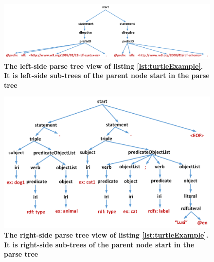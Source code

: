 \begin{figure}
		\centering\includegraphics[width=1.12\linewidth]{images/implementationParseTreeLeft.png}
		\caption{\textbf{The left-side parse tree view of listing \ref{lst:turtleExample}. It is left-side sub-trees of the parent node start in the parse tree}}
	\label{Fig:implementationParseTreeLeft}
\end{figure}

\begin{figure}
		\includegraphics[width=1\linewidth]{images/implementationParseTreeRight.png}
	\caption{\textbf{The right-side parse tree view of listing \ref{lst:turtleExample}. It is right-side sub-trees of the parent node \textbf{start} in the parse tree}}
	\label{Fig:implementationParseTreeRight}

\end{figure}

